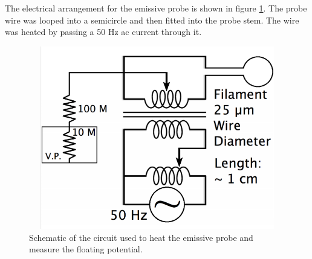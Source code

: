The electrical arrangement for the emissive probe is shown in figure \ref{fig:emissive}. The probe wire was looped into a semicircle and then fitted into the probe stem. The wire was heated by passing a 50 Hz ac current through it. 
\begin{figure}[H]
\centering
\includegraphics[width=1.0\textwidth, height = 8cm]{em_circuit.png}
\caption{Schematic of the circuit used to heat the emissive probe and measure the floating potential.}
\label{fig:emissive}
\end{figure}


